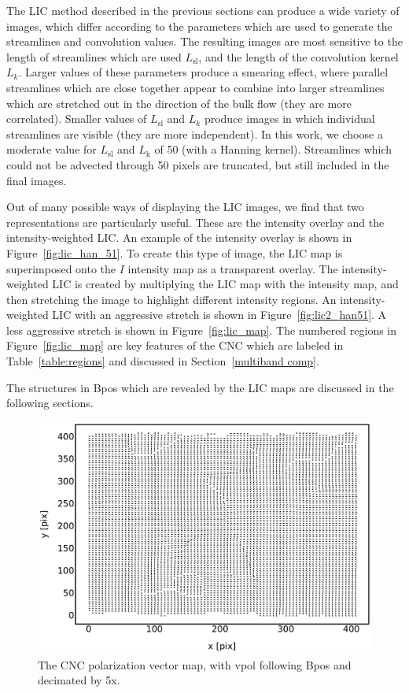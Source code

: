 The LIC method described in the previous sections can produce a wide variety of images, which differ according to the parameters which are used to generate the streamlines and convolution values. The resulting images are most sensitive to the length of streamlines which are used $L_{\mathrm{sl}}$, and the length of the convolution kernel $L_{k}$. Larger values of these parameters produce a smearing effect, where parallel streamlines which are close together appear to combine into larger streamlines which are stretched out in the direction of the bulk flow (they are more correlated). Smaller values of $L_{\mathrm{sl}}$ and $L_{k}$ produce images in which individual streamlines are visible (they are more independent). In this work, we choose a moderate value for $L_{\mathrm{sl}}$ and $L_{\mathrm{k}}$ of 50 (with a Hanning kernel). Streamlines which could not be advected through 50 pixels are truncated, but still included in the final images.

Out of many possible ways of displaying the LIC images, we find that two representations are particularly useful. These are the intensity overlay and the intensity-weighted LIC\@. An example of the intensity overlay is shown in Figure~\ref{fig:lic_han_51}. To create this type of image, the LIC map is superimposed onto the $I$ intensity map as a transparent overlay. The intensity-weighted LIC is created by multiplying the LIC map with the intensity map, and then stretching the image to highlight different intensity regions. An intensity-weighted LIC with an aggressive stretch is shown in Figure~\ref{fig:lic2_han51}. A less aggressive stretch is shown in Figure~\ref{fig:lic_map}. The numbered regions in Figure~\ref{fig:lic_map} are key features of the CNC which are labeled in Table~\ref{table:regions} and discussed in Section~\ref{multiband comp}.

The structures in \gls{Bpos} which are revealed by the LIC maps are discussed in the following sections.

\begin{figure}[!htbp]
\centering
\includegraphics[width=\textwidth]{figures/carina/vectors_5}
\caption[~The CNC polarization vector map, decimated by 5x.]{The CNC polarization vector map, with \gls{vpol} following \gls{Bpos} and decimated by 5x.}
\label{fig:vectors_5}
\end{figure}

